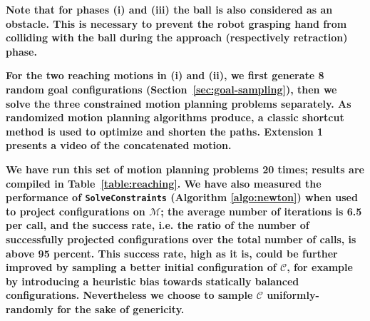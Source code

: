 \documentclass{article}
\newcommand\manifold{\mathcal{M}}
\begin{document}
\textbf{Note that for phases (i) and (iii) the ball is also considered
  as an obstacle. This is necessary to prevent the robot grasping hand
  from colliding with the ball during the approach (respectively
  retraction) phase.}

\textbf{For the two reaching motions in (i) and (ii), we first
  generate 8 random goal configurations
  (Section~\ref{sec:goal-sampling}), then we solve the three
  constrained motion planning problems separately. As randomized
  motion planning algorithms produce, a classic shortcut method is
  used to optimize and shorten the paths. Extension 1 presents a
  video of the concatenated motion.}

\textbf{We have run this set of motion planning problems 20 times;
  results are compiled in Table~\ref{table:reaching}. We have also
  measured the performance of \texttt{SolveConstraints} (Algorithm
  \ref{algo:newton}) when used to project configurations on
  $\manifold$; the average number of iterations is 6.5 per call, and
  the success rate, i.e. the ratio of the number of successfully
  projected configurations over the total number of calls, is above 95
  percent. This success rate, high as it is, could be further improved
  by sampling a better initial configuration of $\mathcal{C}$, for
  example by introducing a heuristic bias towards statically balanced
  configurations. Nevertheless we choose to sample $\mathcal{C}$
  uniformly-randomly for the sake of genericity.}
\end{document}
